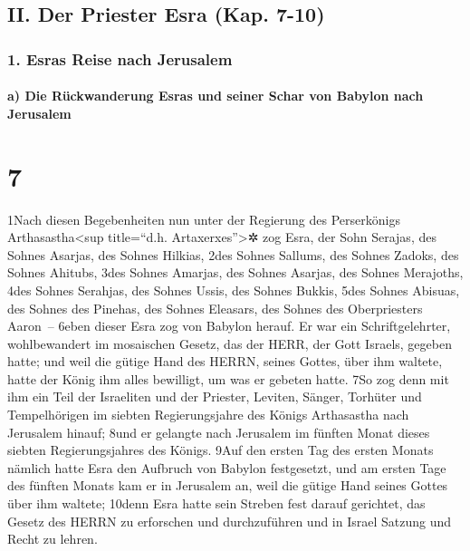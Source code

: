 \hypertarget{ii.-der-priester-esra-kap.-7-10}{%
\subsection{II. Der Priester Esra (Kap.
7-10)}\label{ii.-der-priester-esra-kap.-7-10}}

\hypertarget{esras-reise-nach-jerusalem}{%
\subsubsection{1. Esras Reise nach
Jerusalem}\label{esras-reise-nach-jerusalem}}

\hypertarget{a-die-ruxfcckwanderung-esras-und-seiner-schar-von-babylon-nach-jerusalem}{%
\paragraph{a) Die Rückwanderung Esras und seiner Schar von Babylon nach
Jerusalem}\label{a-die-ruxfcckwanderung-esras-und-seiner-schar-von-babylon-nach-jerusalem}}

\hypertarget{section-6}{%
\section{7}\label{section-6}}

1Nach diesen Begebenheiten nun unter der Regierung des Perserkönigs
Arthasastha\textless sup title=``d.h. Artaxerxes''\textgreater✲ zog
Esra, der Sohn Serajas, des Sohnes Asarjas, des Sohnes Hilkias, 2des
Sohnes Sallums, des Sohnes Zadoks, des Sohnes Ahitubs, 3des Sohnes
Amarjas, des Sohnes Asarjas, des Sohnes Merajoths, 4des Sohnes Serahjas,
des Sohnes Ussis, des Sohnes Bukkis, 5des Sohnes Abisuas, des Sohnes des
Pinehas, des Sohnes Eleasars, des Sohnes des Oberpriesters Aaron~--
6eben dieser Esra zog von Babylon herauf. Er war ein Schriftgelehrter,
wohlbewandert im mosaischen Gesetz, das der HERR, der Gott Israels,
gegeben hatte; und weil die gütige Hand des HERRN, seines Gottes, über
ihm waltete, hatte der König ihm alles bewilligt, um was er gebeten
hatte. 7So zog denn mit ihm ein Teil der Israeliten und der Priester,
Leviten, Sänger, Torhüter und Tempelhörigen im siebten Regierungsjahre
des Königs Arthasastha nach Jerusalem hinauf; 8und er gelangte nach
Jerusalem im fünften Monat dieses siebten Regierungsjahres des Königs.
9Auf den ersten Tag des ersten Monats nämlich hatte Esra den Aufbruch
von Babylon festgesetzt, und am ersten Tage des fünften Monats kam er in
Jerusalem an, weil die gütige Hand seines Gottes über ihm waltete;
10denn Esra hatte sein Streben fest darauf gerichtet, das Gesetz des
HERRN zu erforschen und durchzuführen und in Israel Satzung und Recht zu
lehren.

